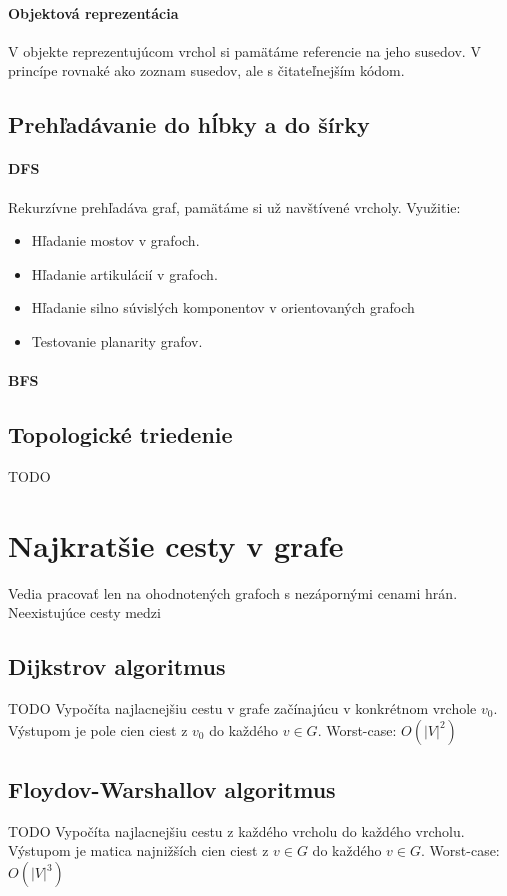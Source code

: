 		\paragraph{Objektová reprezentácia}
		V objekte reprezentujúcom vrchol si pamätáme referencie na jeho susedov. V princípe rovnaké ako zoznam susedov, ale s čitateľnejším kódom.

	\subsection{Prehľadávanie do hĺbky a do šírky}
		\paragraph{DFS}
			Rekurzívne prehľadáva graf, pamätáme si už navštívené vrcholy.
			Využitie: 
			\begin{itemize}
				\item Hľadanie mostov v grafoch.
				\item Hľadanie artikulácií v grafoch.
				\item Hľadanie silno súvislých komponentov v orientovaných grafoch
				\item Testovanie planarity grafov.
			\end{itemize}


		\paragraph{BFS}

	\subsection{Topologické triedenie} TODO

\section{Najkratšie cesty v grafe}
	Vedia pracovať len na ohodnotených grafoch s nezápornými cenami hrán. Neexistujúce cesty medzi 
	\subsection{Dijkstrov algoritmus} TODO
		Vypočíta najlacnejšiu cestu v grafe začínajúcu v konkrétnom vrchole $v_{0}$. Výstupom je pole cien ciest z $v_{0}$ do každého $v \in G$.
		Worst-case: $O(|V|^{2})$
	\subsection{Floydov-Warshallov algoritmus} TODO
		Vypočíta najlacnejšiu cestu z každého vrcholu do každého vrcholu. Výstupom je matica najnižších cien ciest z $v \in G$ do každého $v \in G$.
		Worst-case: $O(|V|^{3})$


